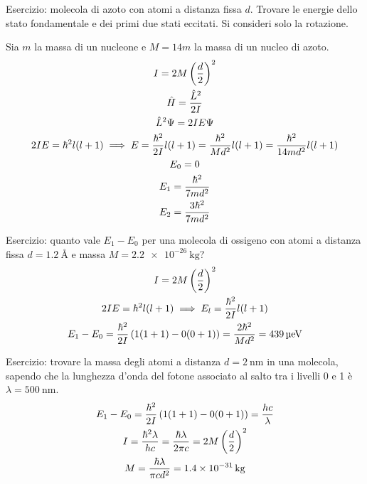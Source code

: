 Esercizio:
molecola di azoto  con atomi a distanza fissa $d$.
Trovare le energie dello stato fondamentale e dei primi due stati eccitati.
Si consideri solo la rotazione.

Sia $m$ la massa di un nucleone e $M = 14 m$ la massa di un nucleo di azoto.
\begin{gather}
    I = 2 M \left( \frac{d}{2} \right)^2 \\
    \hat{H} = \frac{\hat{L}^2}{2 I} \\
    \hat{L}^2 \Psi = 2 I E \Psi \\
    2 I E = \hbar^2 l (l + 1) \implies E
    = \frac{\hbar^2}{2 I} l (l + 1)
    = \frac{\hbar^2}{M d^2} l (l + 1)
    = \frac{\hbar^2}{14 m d^2} l (l + 1) \\
    E_0 = 0 \\
    E_1 = \frac{\hbar^2}{7 m d^2} \\
    E_2 = \frac{3 \hbar^2}{7 m d^2}
\end{gather}

Esercizio:
quanto vale $E_1 - E_0$ per una molecola di ossigeno  con atomi a distanza fissa $d = \qty{1.2}{\angstrom}$ e massa $M = \qty{2.2e-26}{\kilo\gram}$?
\begin{gather}
    I = 2 M \left( \frac{d}{2} \right)^2 \\
    2 I E = \hbar^2 l (l + 1) \implies E_l = \frac{\hbar^2}{2 I} l (l + 1) \\
    E_1 - E_0 = \frac{\hbar^2}{2 I} \left( 1 (1 + 1) - 0 (0 + 1) \right)
    = \frac{2 \hbar^2}{M d^2}
    = \qty{439}{\micro\electronvolt}
\end{gather}

Esercizio:
trovare la massa degli atomi a distanza $d = \qty{2}{\nano\metre}$ in una molecola, sapendo che la lunghezza d'onda del fotone associato al salto tra i livelli 0 e 1 è $\lambda = \qty{500}{\nano\metre}$.
\begin{gather}
    E_1 - E_0 = \frac{\hbar^2}{2 I} \left( 1 (1 + 1) - 0 (0 + 1) \right) = \frac{h c}{\lambda} \\
    I = \frac{\hbar^2 \lambda}{hc} = \frac{\hbar \lambda}{2 \pi c} = 2 M \left( \frac{d}{2} \right)^2 \\
    M = \frac{\hbar \lambda}{\pi c d^2} = \qty{1.4e-31}{\kilo\gram}
\end{gather}
